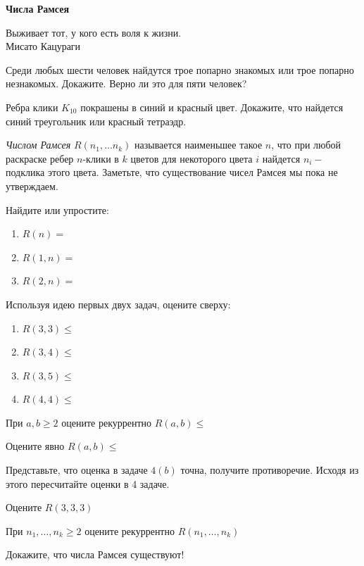 \centerline{\bf \Huge Числа Рамсея}

\begin{flushright}
        \scriptsize{Выживает тот, у кого есть воля к жизни.\\ Мисато Кацураги}
\end{flushright}


 Среди любых шести человек найдутся трое попарно знакомых или трое попарно незнакомых. Докажите. Верно ли это для пяти человек?

 Ребра клики $K_{10}$ покрашены в синий и красный цвет. Докажите, что найдется синий треугольник или красный тетраэдр.

\textit{Числом Рамсея} $R(n_1, \dots n_k)$ называется наименьшее такое $n$, что при любой раскраске ребер $n$-клики в $k$ цветов для некоторого цвета $i$ найдется $n_i-$подклика этого цвета. Заметьте, что существование чисел Рамсея мы пока не утверждаем.

 Найдите или упростите: 
\begin{enumerate}  
    \begin{enumerate}
        \item $R(n)=$
        \item $R(1, n)=$
        \item $R(2, n)=$
    \end{enumerate} 
\end{enumerate}

 Используя идею первых двух задач, оцените сверху:
\begin{enumerate}  
    \begin{enumerate}
        \item $R(3, 3)\leq$
        \item $R(3, 4)\leq$
        \item $R(3, 5)\leq$
        \item $R(4, 4)\leq$
    \end{enumerate} 
\end{enumerate}

 При $a, b \geq 2$ оцените рекуррентно $R(a, b)\leq$ 

 Оцените явно $R(a, b)\leq$

 Представьте, что оценка в задаче $4(b)$ точна, получите противоречие. Исходя из этого пересчитайте оценки в 4 задаче. 

 Оцените $R(3, 3, 3)$

 При $n_1, \dots, n_k \geq 2$ оцените рекуррентно $R(n_1, \dots, n_k)$

 Докажите, что числа Рамсея существуют!